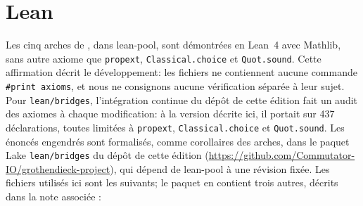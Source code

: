 \section{Lean}\label{sec:lean-lit}

Les cinq arches de \lp{}, dans lean-pool, sont démontrées en Lean~4 avec Mathlib, sans autre axiome que \texttt{propext}, \texttt{Classical.choice} et \texttt{Quot.sound}. Cette affirmation décrit le développement: les fichiers ne contiennent aucune commande \texttt{\#print axioms}, et nous ne consignons aucune vérification séparée à leur sujet. Pour \texttt{lean/bridges}, l'intégration continue du dépôt de cette édition fait un audit des axiomes à chaque modification: à la version décrite ici, il portait sur 437 déclarations, toutes limitées à \texttt{propext}, \texttt{Classical.choice} et \texttt{Quot.sound}. Les énoncés engendrés sont formalisés, comme corollaires des arches, dans le paquet Lake \texttt{lean/bridges} du dépôt de cette édition (\url{https://github.com/Commutator-IO/grothendieck-project}), qui dépend de lean-pool à une révision fixée. Les fichiers utilisés ici sont les suivants; le paquet en contient trois autres, décrits dans la note associée \cite{bridges-notes}:

